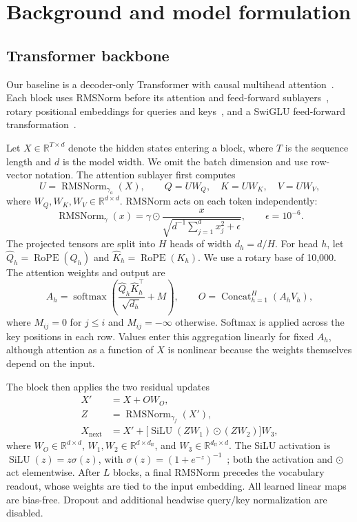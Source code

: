 \documentclass[11pt,a4paper]{article}
\newcommand{\silu}{\operatorname{SiLU}}
\newcommand{\rms}{\operatorname{RMSNorm}}
\newcommand{\softmax}{\operatorname{softmax}}
\begin{document}
\section{Background and model formulation}
\label{sec:background}

\subsection{Transformer backbone}
\label{sec:backbone}
Our baseline is a decoder-only Transformer with causal multihead attention~\citep{transformer,gpt}. Each block uses RMSNorm before its attention and feed-forward sublayers~\citep{rmsnorm}, rotary positional embeddings for queries and keys~\citep{rope}, and a SwiGLU feed-forward transformation~\citep{swiglu}.

Let $X\in\mathbb{R}^{T\times d}$ denote the hidden states entering a block, where $T$ is the sequence length and $d$ is the model width. We omit the batch dimension and use row-vector notation. The attention sublayer first computes
\begin{equation}
 U=\rms_{\gamma_a}(X),\qquad
 Q=UW_Q,\quad K=UW_K,\quad V=UW_V,
 \label{eq:projections}
\end{equation}
where $W_Q,W_K,W_V\in\mathbb{R}^{d\times d}$. RMSNorm acts on each token independently:
\begin{equation}
 \rms_\gamma(x)=\gamma\odot
 \frac{x}{\sqrt{d^{-1}\sum_{j=1}^{d}x_j^2+\epsilon}},
 \qquad \epsilon=10^{-6}.
 \label{eq:rmsnorm}
\end{equation}
The projected tensors are split into $H$ heads of width $d_h=d/H$. For head $h$, let $\widehat Q_h=\operatorname{RoPE}(Q_h)$ and $\widehat K_h=\operatorname{RoPE}(K_h)$. We use a rotary base of 10,000. The attention weights and output are
\begin{equation}
 A_h=\softmax\!\left(
 \frac{\widehat Q_h\widehat K_h^\top}{\sqrt{d_h}}+M
 \right),\qquad
 O=\operatorname{Concat}_{h=1}^{H}(A_hV_h),
 \label{eq:attention}
\end{equation}
where $M_{ij}=0$ for $j\leq i$ and $M_{ij}=-\infty$ otherwise. Softmax is applied across the key positions in each row. Values enter this aggregation linearly for fixed $A_h$, although attention as a function of $X$ is nonlinear because the weights themselves depend on the input.

The block then applies the two residual updates
\begin{align}
 X'&=X+OW_O,\\
 Z&=\rms_{\gamma_f}(X'),\\
 X_{\mathrm{next}}&=X'+
 \big[\silu(ZW_1)\odot(ZW_2)\big]W_3,
 \label{eq:block}
\end{align}
where $W_O\in\mathbb{R}^{d\times d}$, $W_1,W_2\in\mathbb{R}^{d\times d_{\mathrm{ff}}}$, and $W_3\in\mathbb{R}^{d_{\mathrm{ff}}\times d}$. The SiLU activation is $\silu(z)=z\sigma(z)$, with $\sigma(z)=(1+e^{-z})^{-1}$~\citep{silu,swish}; both the activation and $\odot$ act elementwise. After $L$ blocks, a final RMSNorm precedes the vocabulary readout, whose weights are tied to the input embedding. All learned linear maps are bias-free. Dropout and additional headwise query/key normalization are disabled.
\end{document}
